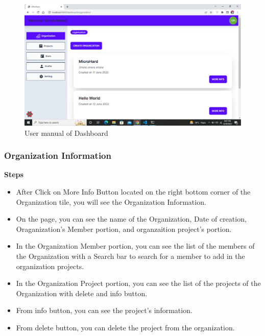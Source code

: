 \begin{figure}[H]
    \centering
    \includegraphics[scale=0.4]{./diagrams/user-manual/Screenshot (18).png}
    \caption{User manual of Dashboard}
    \label{fig:user-1}

\end{figure}

\subsubsection{Organization Information}
\textbf{Steps}
\begin{itemize}
    \item After Click on More Info Button located on the right bottom corner of the Organization tile, you will see the Organization Information.
    \item On the page, you can see the name of the Organization, Date of creation, Oraganization's Member portion, and organzaition project's portion.
    \item In the Organization Member portion, you can see the list of the members of the Organization with a Search bar to search for a member to add in the organization projects.
    \item In the Organization Project portion, you can see the list of the projects of the Organization with delete and info button.
    \item From info button, you can see the project's information.
    \item From delete button, you can delete the project from the organization.
\end{itemize}

